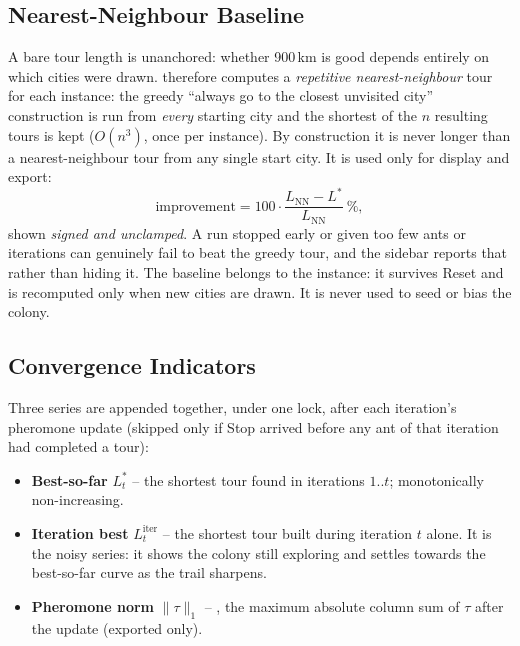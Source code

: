 \documentclass[11pt,a4paper]{article}
\begin{document}
\subsection{Nearest-Neighbour Baseline}\label{sec:nn}
A bare tour length is unanchored: whether 900\,km is good depends entirely on which cities were drawn.
 therefore computes a \emph{repetitive nearest-neighbour} tour
for each instance: the greedy ``always go to the closest unvisited city'' construction is run from
\emph{every} starting city and the shortest of the $n$ resulting tours is kept ($O(n^3)$, once per
instance). By construction it is never longer than a nearest-neighbour tour from any single start city. It is used
only for display and export:
\begin{equation}
\text{improvement}=100\cdot\frac{L_{\text{NN}}-L^\ast}{L_{\text{NN}}}\ \%,
\end{equation}
shown \emph{signed and unclamped}. A run stopped early or given too few ants or iterations can genuinely
fail to beat the greedy tour, and the sidebar reports that rather than hiding it. The baseline belongs to
the instance: it survives Reset and is recomputed only when new cities are drawn. It is never used to seed
or bias the colony.

\subsection{Convergence Indicators}\label{sec:conv}
Three series are appended together, under one lock, after each iteration's pheromone update (skipped only
if Stop arrived before any ant of that iteration had completed a tour):
\begin{itemize}
  \item \textbf{Best-so-far} $L^\ast_t$ -- the shortest tour found in iterations $1..t$; monotonically
        non-increasing.
  \item \textbf{Iteration best} $L^{\text{iter}}_t$ -- the shortest tour built during iteration $t$ alone.
        It is the noisy series: it shows the colony still exploring and settles towards the best-so-far
        curve as the trail sharpens.
  \item \textbf{Pheromone norm} $\lVert\tau\rVert_1$ -- , the maximum
        absolute column sum of $\tau$ after the update (exported only).
\end{itemize}
\end{document}
